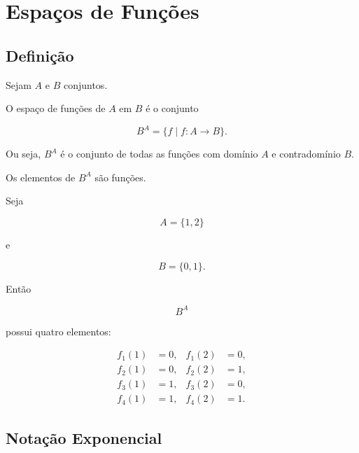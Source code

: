 \documentclass[../../main]{subfiles}
\begin{document}
\section{Espaços de Funções}
\label{sec:matematica:funcoes:espacos-de-funcoes}

\subsection{Definição}

\begin{defn}
	\label{def:matematica:funcoes:espacos:espaco-funcoes}

	Sejam \(A\) e \(B\) conjuntos.

	O espaço de funções de \(A\) em \(B\) é o conjunto

	\[
		B^A
		=
		\{
		f
		\mid
		f:A\to B
		\}.
	\]

	Ou seja, \(B^A\) é o conjunto de todas as funções com domínio
	\(A\) e contradomínio \(B\).

\end{defn}

\begin{obs}

	Os elementos de \(B^A\) são funções.

\end{obs}

\begin{ex}

	Seja

	\[
		A=\{1,2\}
	\]

	e

	\[
		B=\{0,1\}.
	\]

	Então

	\[
		B^A
	\]

	possui quatro elementos:

	\[
		\begin{aligned}
			f_1(1) & =0, & f_1(2) & =0, \\
			f_2(1) & =0, & f_2(2) & =1, \\
			f_3(1) & =1, & f_3(2) & =0, \\
			f_4(1) & =1, & f_4(2) & =1.
		\end{aligned}
	\]

\end{ex}

\subsection{Notação Exponencial}
\end{document}
